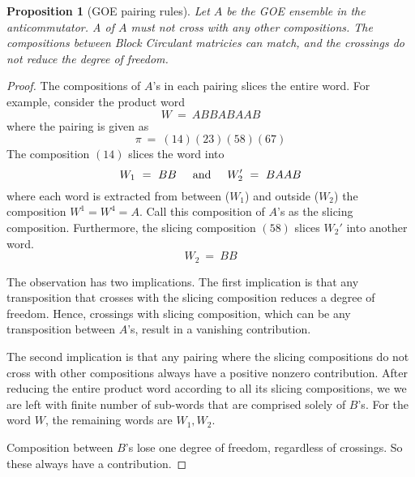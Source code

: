 \documentclass[12pt,reqno]{amsart}
\theoremstyle{plain} %
\newtheorem{prop}[theorem]{Proposition}
\theoremstyle{remark}
\theoremstyle{definition}
\begin{document}
\begin{prop} [GOE pairing rules]
    Let $A$ be the GOE ensemble in the anticommutator. 
    A  of $A$ must not cross with any other 
    compositions. The compositions between Block 
    Circulant matricies can match, and the crossings 
    do not reduce the degree of freedom. 
\end{prop}
\begin{proof}
    The compositions of $A$'s in each pairing slices 
    the entire word. For example, consider the product word 
    \[
        W \ = \ ABBABAAB
    \]
    where the pairing is given as 
    \[
        \pi \ = \ (1 4)(2 3)(5 8) (6 7)
    \]
    The composition $(14)$ slices the word into 
    \[
        W_1 \ = \ BB 
        { \hspace{5mm} \textrm{and} \hspace{5mm} } 
        W_2' \ = \ BAAB 
    \]
    where each word is extracted from between ($W_1$) and 
    outside ($W_2$) the composition $W^1 = W^4 = A$. Call 
    this composition of $A$'s as the slicing composition.
    Furthermore, the slicing composition $(58)$ slices $W_2'$ 
    into another word. 
    \[
        W_2 \ = \ BB
    \]

    The observation has two implications. The first implication 
    is that any transposition that crosses with the slicing 
    composition reduces a degree of freedom. Hence, crossings 
    with slicing composition, which can be any transposition between $A$'s, 
    result in a vanishing contribution. 

    The second implication is that any pairing where the 
    slicing compositions do not cross with other compositions 
    always have a positive nonzero contribution. After reducing the entire 
    product word according to all its slicing compositions, we 
    we are left with finite number of sub-words that are comprised solely 
    of $B$'s. For the word $W$, the remaining words are $W_1, W_2$. 

    Composition between $B$'s lose one degree of freedom, regardless of 
    crossings. So these always have a contribution.
\end{proof}
\end{document}
